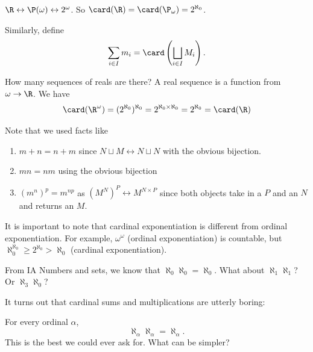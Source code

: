 \documentclass[a4paper]{article}
\begin{document}
\begin{eg}
  $\R \leftrightarrow \P(\omega) \leftrightarrow 2^\omega$. So $\card(\R) = \card(\P_\omega) = 2^{\aleph_0}$.
\end{eg}

Similarly, define
\[
  \sum_{i \in I} m_i = \card\left(\bigsqcup_{i\in I} M_i\right).
\]

\begin{eg}
  How many sequences of reals are there? A real sequence is a function from $\omega \to \R$. We have
  \[
    \card(\R^\omega) = (2^{\aleph_0})^{\aleph_0} = 2^{\aleph_0 \times \aleph_0} = 2^{\aleph_0} = \card(\R)
  \]
\end{eg}
Note that we used facts like
\begin{prop}\leavevmode
  \begin{enumerate}
    \item $m + n = n + m$ since $N\sqcup M \leftrightarrow N\sqcup N$ with the obvious bijection.
    \item $mn = nm$ using the obvious bijection
    \item $(m^n)^p = m^{np}$ as $(M^N)^P \leftrightarrow M^{N\times P}$ since both objects take in a $P$ and an $N$ and returns an $M$.
  \end{enumerate}
\end{prop}
It is important to note that cardinal exponentiation is different from ordinal exponentiation. For example, $\omega^\omega$ (ordinal exponentiation) is countable, but $\aleph_0^{\aleph_0} \geq 2^{\aleph_0} > \aleph_0$ (cardinal exponentiation).

From IA Numbers and sets, we know that $\aleph_0 \aleph_0 = \aleph_0$. What about $\aleph_1 \aleph_1$? Or $\aleph_3 \aleph_0$?

It turns out that cardinal sums and multiplications are utterly boring:
\begin{thm}
  For every ordinal $\alpha$,
  \[
    \aleph_\alpha \aleph_\alpha = \aleph_\alpha.
  \]
  This is the best we could ever ask for. What can be simpler?
\end{thm}
\end{document}
